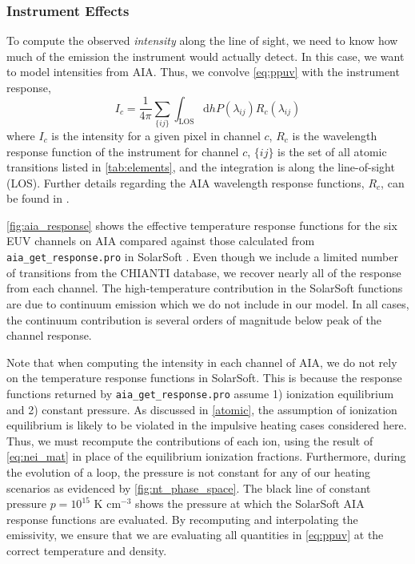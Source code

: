 \subsubsection{Instrument Effects}\label{instrument}

To compute the observed \textit{intensity} along the line of sight, we need to know how much of the emission the instrument would actually detect. In this case, we want to model intensities from AIA. Thus, we convolve \autoref{eq:ppuv} with the instrument response,
\begin{equation}\label{eq:intensity}
    I_c = \frac{1}{4\pi}\sum_{\{ij\}}\int_{\text{LOS}}\mathrm{d}hP(\lambda_{ij})R_c(\lambda_{ij})
\end{equation}
where $I_c$ is the intensity for a given pixel in channel $c$, $R_c$ is the wavelength response function of the instrument for channel $c$, $\{ij\}$ is the set of all atomic transitions listed in \autoref{tab:elements}, and the integration is along the line-of-sight (LOS). Further details regarding the AIA wavelength response functions, $R_c$, can be found in \citet{boerner_initial_2012}.

\autoref{fig:aia_response} shows the effective temperature response functions for the six EUV channels on AIA compared against those calculated from \texttt{aia\_get\_response.pro} in SolarSoft \citep{freeland_data_1998}. Even though we include a limited number of transitions from the CHIANTI database, we recover nearly all of the response from each channel. The high-temperature contribution in the SolarSoft functions are due to continuum emission which we do not include in our model. In all cases, the continuum contribution is several orders of magnitude below peak of the channel response.

Note that when computing the intensity in each channel of AIA, we do not rely on the temperature response functions in SolarSoft. This is because the response functions returned by \texttt{aia\_get\_response.pro} assume 1) ionization equilibrium and 2) constant pressure. As discussed in \autoref{atomic}, the assumption of ionization equilibrium is likely to be violated in the impulsive heating cases considered here. Thus, we must recompute the contributions of each ion, using the result of \autoref{eq:nei_mat} in place of the equilibrium ionization fractions. Furthermore, during the evolution of a loop, the pressure is not constant for any of our heating scenarios as evidenced by \autoref{fig:nt_phase_space}. The black line of constant pressure $p=10^{15}$ K cm$^{-3}$ shows the pressure at which the SolarSoft AIA response functions are evaluated. By recomputing and interpolating the emissivity, we ensure that we are evaluating all quantities in \autoref{eq:ppuv} at the correct temperature and density. 

